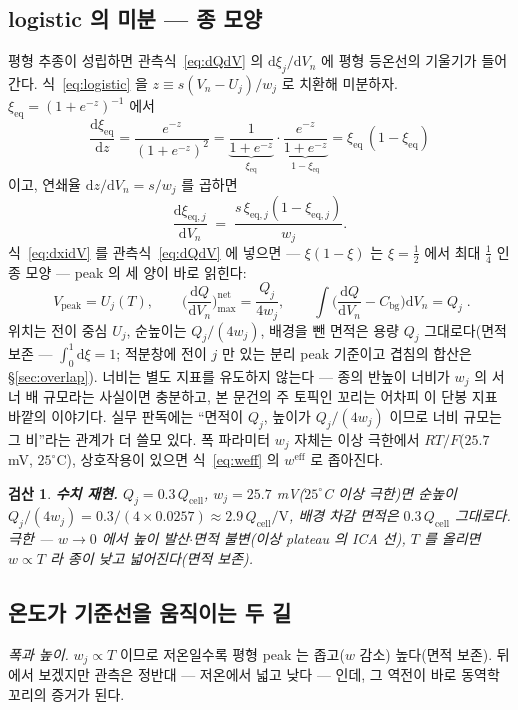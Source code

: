\documentclass[11pt,a4paper]{article}
\newtheorem*{verifybox}{검산}
\newcommand{\dd}{\mathrm{d}}
\newcommand{\eff}{\mathrm{eff}}
\newcommand{\eq}{\mathrm{eq}}
\newcommand{\cell}{\mathrm{cell}}
\newcommand{\bg}{\mathrm{bg}}
\newcommand{\peak}{\mathrm{peak}}
\begin{document}
\subsection{logistic 의 미분 — 종 모양}
평형 추종이 성립하면 관측식~\eqref{eq:dQdV} 의 $\dd\xi_j/\dd V_n$ 에 평형 등온선의 기울기가 들어간다.
식~\eqref{eq:logistic} 을 $z\equiv s(V_n-U_j)/w_j$ 로 치환해 미분하자. $\xi_{\eq}=(1+e^{-z})^{-1}$
에서
\begin{equation}
\frac{\dd\xi_{\eq}}{\dd z}
=\frac{e^{-z}}{(1+e^{-z})^{2}}
=\underbrace{\frac{1}{1+e^{-z}}}_{\xi_{\eq}}\cdot
\underbrace{\frac{e^{-z}}{1+e^{-z}}}_{1-\xi_{\eq}}
=\xi_{\eq}\,(1-\xi_{\eq})
\label{eq:belliden}
\end{equation}
이고, 연쇄율 $\dd z/\dd V_n=s/w_j$ 를 곱하면
\begin{equation}
\frac{\dd\xi_{\eq,j}}{\dd V_n}\;=\;\frac{s\,\xi_{\eq,j}(1-\xi_{\eq,j})}{w_j}.
\label{eq:dxidV}
\end{equation}
식~\eqref{eq:dxidV} 를 관측식~\eqref{eq:dQdV} 에 넣으면 — $\xi(1-\xi)$ 는 $\xi=\tfrac12$ 에서
최대 $\tfrac14$ 인 종 모양 — peak 의 세 양이 바로 읽힌다:
\begin{equation}
\boxed{\;V_\peak=U_j(T),\qquad
\Big(\frac{\dd Q}{\dd V_n}\Big)^{\text{net}}_{\max}=\frac{Q_j}{4w_j},\qquad
\int\Big(\frac{\dd Q}{\dd V_n}-C_\bg\Big)\dd V_n=Q_j\;.}
\label{eq:eqpeak}
\end{equation}
위치는 전이 중심 $U_j$, 순높이는 $Q_j/(4w_j)$, 배경을 뺀 면적은 용량 $Q_j$ 그대로다(면적 보존 —
$\int_0^1\dd\xi=1$; 적분창에 전이 $j$ 만 있는 분리 peak 기준이고 겹침의 합산은 \S\ref{sec:overlap}). 너비는 별도 지표를 유도하지 않는다 — 종의 반높이 너비가 $w_j$ 의 서너 배 규모라는
사실이면 충분하고, 본 문건의 주 토픽인 꼬리는 어차피 이 단봉 지표 바깥의 이야기다. 실무 판독에는 ``면적이
$Q_j$, 높이가 $Q_j/(4w_j)$ 이므로 너비 규모는 그 비''라는 관계가 더 쓸모 있다. 폭 파라미터 $w_j$ 자체는
이상 극한에서 $RT/F$($25.7$ mV, $25^\circ$C), 상호작용이 있으면 식~\eqref{eq:weff} 의 $w^{\eff}$ 로
좁아진다.

\begin{verifybox}
\textbf{수치 재현.} $Q_j=0.3\,Q_\cell$, $w_j=25.7$ mV($25^\circ$C 이상 극한)면 순높이
$Q_j/(4w_j)=0.3/(4\times0.0257)\approx2.9\,Q_\cell/\mathrm V$, 배경 차감 면적은 $0.3\,Q_\cell$
그대로다. 극한 — $w\to0$ 에서 높이 발산$\cdot$면적 불변(이상 plateau 의 ICA 선), $T$ 를 올리면
$w\propto T$ 라 종이 낮고 넓어진다(면적 보존).
\end{verifybox}

\subsection{온도가 기준선을 움직이는 두 길}
\emph{폭과 높이.} $w_j\propto T$ 이므로 저온일수록 평형 peak 는 좁고($w$ 감소) 높다(면적 보존). 뒤에서
보겠지만 관측은 정반대 — 저온에서 넓고 낮다 — 인데, 그 역전이 바로 동역학 꼬리의 증거가 된다.
\end{document}
